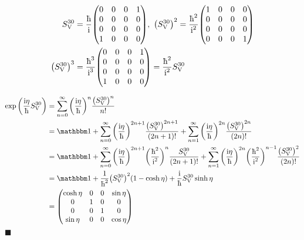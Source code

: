 \documentclass[twoside]{amsart}
\newcommand{\cqd}{\hfill$\blacksquare$}
\numberwithin{equation}{section}
\begin{document}
\begin{align*}
    S^{30}_\textnormal{V}&=\frac\hbar\im\mqty(0&0&0&1\\0&0&0&0\\0&0&0&0\\1&0&0&0),\ \qty(S^{30}_\textnormal{V})^2=\frac{\hbar^2}{\im^2}\mqty(1&0&0&0\\0&0&0&0\\0&0&0&0\\0&0&0&1)\\
    \qty(S^{30}_\textnormal{V})^3&=\frac{\hbar^3}{\im^3}\mqty(0&0&0&1\\0&0&0&0\\0&0&0&0\\1&0&0&0)=\frac{\hbar^2}{\im^2}S^{30}_\textnormal{V}
\end{align*}

\begin{align*}
    \exp\qty(\frac{\im\eta}{\hbar}S^{30}_\textnormal{V})&=\sum\limits_{n=0}^\infty\qty(\frac{\im\eta}{\hbar})^n\frac{\qty(S^{30}_\textnormal{V})^n}{n!}\\
    &=\mathbbm 1+\sum\limits_{n=0}^{\infty}\qty(\frac{\im\eta}{\hbar})^{2n+1}\frac{\qty(S^{30}_\textnormal{V})^{2n+1}}{(2n+1)!}+\sum\limits_{n=1}^{\infty}\qty(\frac{\im\eta}{\hbar})^{2n}\frac{\qty(S^{30}_\textnormal{V})^{2n}}{(2n)!}\\
    &=\mathbbm 1+\sum\limits_{n=0}^{\infty}\qty(\frac{\im\eta}{\hbar})^{2n+1}\qty(\frac{\hbar^2}{\im^2})^{n}\frac{S^{30}_\textnormal{V}}{(2n+1)!}+\sum\limits_{n=1}^{\infty}\qty(\frac{\im\eta}{\hbar})^{2n}\qty(\frac{\hbar^2}{\im^2})^{n-1}\frac{\qty(S^{30}_\textnormal{V})^{2}}{(2n)!}\\
    &=\mathbbm 1 +\frac{1}{\hbar^2}\qty(S^{30}_\textnormal{V})^2\qty(1-\cosh\eta)+\frac{\im}{\hbar}S^{30}_\textnormal{V}\sinh\eta\\
    &=\mqty(\cosh\eta&0&0&\sin\eta\\0&1&0&0\\0&0&1&0\\\sin\eta&0&0&\cos\eta)
\end{align*}
\cqd
\end{document}

